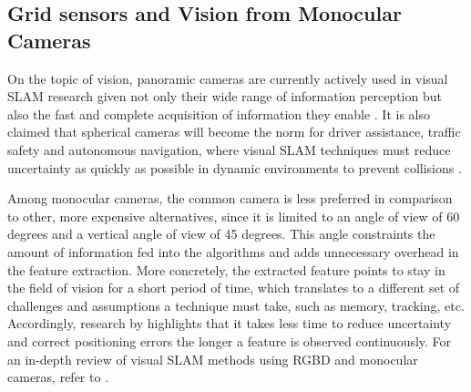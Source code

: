 \subsection{Grid sensors and Vision from Monocular Cameras}\label{chap:3:gridsensors}
On the topic of vision, panoramic cameras are currently actively used in visual SLAM research given not only their wide range of information perception but also the fast and complete acquisition of information they enable \cite{rill2021collision, wojek2012monocular}.
It is also claimed that spherical cameras will become the norm for driver assistance, traffic safety and autonomous navigation, where visual SLAM techniques must reduce uncertainty as quickly as possible in dynamic environments to prevent collisions \cite{zhang2021panoramic}.



Among monocular cameras, the common camera is less preferred in comparison to other, more expensive alternatives, since it is limited to an angle of view of 60 degrees and a vertical angle of view of 45 degrees. This angle constraints the amount of information fed into the algorithms and adds unnecessary overhead in the feature extraction. More concretely, the extracted feature points to stay in the field of vision for a short period of time, which translates to a different set of challenges and assumptions a technique must take, such as memory, tracking, etc. Accordingly, research by \textcite{davison2007monoslam} highlights that it takes less time to reduce uncertainty and correct positioning errors the longer a feature is observed continuously. For an in-depth review of visual SLAM methods using RGBD and monocular cameras, refer to \cite{taketomi2017visual, zhang2021panoramic}. 





